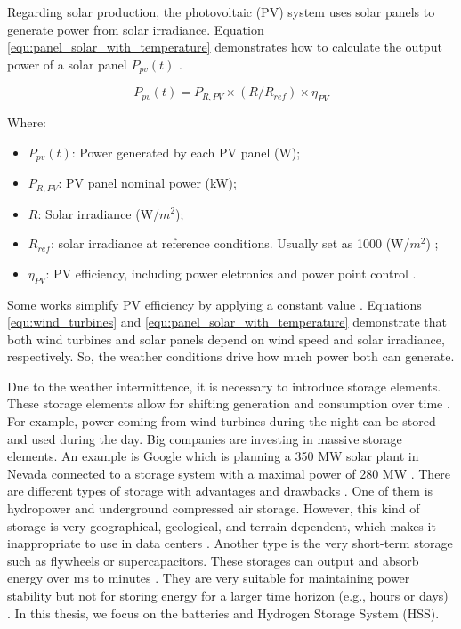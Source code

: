 Regarding solar production, the photovoltaic (PV) system uses solar panels to generate power from solar irradiance. Equation \ref{equ:panel_solar_with_temperature} demonstrates how to calculate the output power of a solar panel $P_{pv}(t)$ \cite{maleki2015optimal, sinha2015review, dong2016optimal}.

\begin{equation}
    \label{equ:panel_solar_with_temperature}
    P_{pv}(t) = P_{R,PV} \times (R / R_{ref}) \times \eta_{PV}
\end{equation}

Where:
\begin{itemize}
    \item $P_{pv}(t)$: Power generated by each PV panel (W);
    \item $P_{R,PV}$: PV panel nominal power (kW);
    \item $R$: Solar irradiance (W/$m^{2}$);
    \item $R_{ref}$: solar irradiance at reference conditions. Usually set as 1000 (W/$m^{2}$) \cite{dong2016optimal};
    \item $\eta_{PV}$: PV efficiency, including power eletronics and power point control \cite{sinha2015review, maleki2015optimal}.
\end{itemize}

Some works simplify PV efficiency by applying a constant value \cite{dong2016optimal, haddad2019mixed}. Equations \ref{equ:wind_turbines} and \ref{equ:panel_solar_with_temperature} demonstrate that both wind turbines and solar panels depend on wind speed and solar irradiance, respectively. So, the weather conditions drive how much power both can generate. 

Due to the weather intermittence, it is necessary to introduce storage elements. These storage elements allow for shifting generation and consumption over time \cite{rostirolla2022survey}. For example, power coming from wind turbines during the night can be stored and used during the day. Big companies are investing in massive storage elements. An example is Google which is planning a 350 MW solar plant in Nevada connected to a storage system with a maximal power of 280 MW \cite{branscombe2020google}. There are different types of storage with advantages and drawbacks \cite{wang2012energy}. One of them is hydropower and underground compressed air storage. However, this kind of storage is very geographical, geological, and terrain dependent, which makes it inappropriate to use in data centers \cite{rostirolla2022survey}. Another type is the very short-term storage such as flywheels or supercapacitors. These storages can output and absorb energy over ms to minutes \cite{wang2012energy}. They are very suitable for maintaining power stability but not for storing energy for a larger time horizon (e.g., hours or days) \cite{rostirolla2022survey}. In this thesis, we focus on the batteries and Hydrogen Storage System (HSS).

